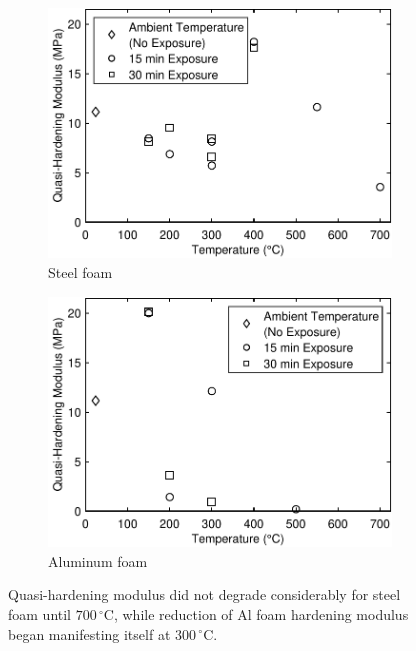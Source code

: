\documentclass[review]{elsarticle}
\begin{document}
{\begin{figure}
	\centering
	\begin{subfigure}{0.50\textwidth}
		\centering
		\includegraphics[width=0.90\linewidth]
		{Tex-Figures/Fig18a-quasi-Hardening-Fe.pdf}
		\caption{Steel foam}
		\label{fig:Quasi-hardening-modulus_Steel}
	\end{subfigure}%
	\begin{subfigure}{0.50\textwidth}
		\centering
		\includegraphics[width=0.90\linewidth]
		{Tex-Figures/Fig18b-quasi-Hardening-Al.pdf}
		\caption{Aluminum foam}
		\label{fig:Quasi-hardening-modulus_Al}
	\end{subfigure}
	\caption{ Quasi-hardening modulus did not degrade considerably for steel foam until $700\,^{\circ}\mathrm{C}$, while reduction of Al foam hardening modulus began manifesting itself at $300\,^{\circ}\mathrm{C}$.}
	\label{fig:Quasi-hardening-modulus}
\end{figure}


}
\end{document}
